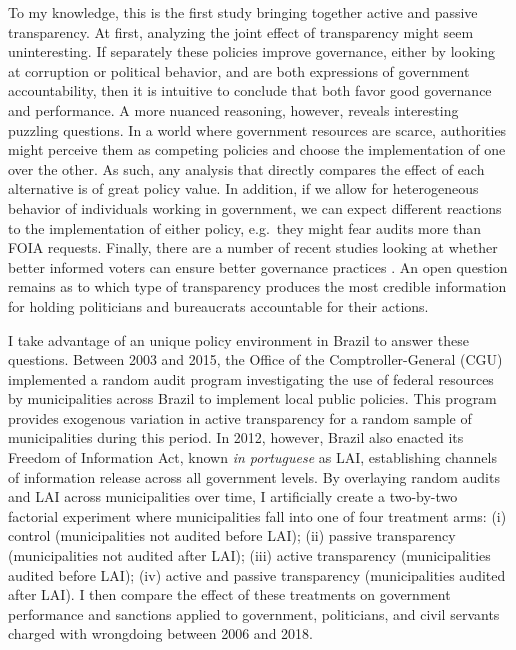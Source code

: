\documentclass[11pt]{article}
\begin{document}
To my knowledge, this is the first study bringing together active and passive transparency. At first, analyzing the joint effect of transparency might seem uninteresting. If separately these policies improve governance, either by looking at corruption or political behavior, and are both expressions of government accountability, then it is intuitive to conclude that both favor good governance and performance. A more nuanced reasoning, however, reveals interesting puzzling questions. In a world where government resources are scarce, authorities might perceive them as competing policies and choose the implementation of one over the other. As such, any analysis that directly compares the effect of each alternative is of great policy value. In addition, if we allow for heterogeneous behavior of individuals working in government, we can expect different reactions to the implementation of either policy, e.g.~they might fear audits more than FOIA requests. Finally, there are a number of recent studies looking at whether better informed voters can ensure better governance practices \citep{PandeCaninformedvoters2011,WintersLackingInformationCondoning2013,ChongDoesCorruptionInformation2015,Weitz-ShapiroCanCitizensDiscern2017}. An open question remains as to which type of transparency produces the most credible information for holding politicians and bureaucrats accountable for their actions.

I take advantage of an unique policy environment in Brazil to answer these questions. Between 2003 and 2015, the Office of the Comptroller-General (CGU) implemented a random audit program investigating the use of federal resources by municipalities across Brazil to implement local public policies. This program provides exogenous variation in active transparency for a random sample of municipalities during this period. In 2012, however, Brazil also enacted its Freedom of Information Act, known  \emph{in portuguese} as LAI, establishing channels of information release across all government levels. By overlaying random audits and LAI across municipalities over time, I artificially create a two-by-two factorial experiment where municipalities fall into one of four treatment arms: (i) control (municipalities not audited before LAI); (ii) passive transparency (municipalities not audited after LAI); (iii) active transparency (municipalities audited before LAI); (iv) active and passive transparency (municipalities audited after LAI). I then compare the effect of these treatments on government performance and sanctions applied to government, politicians, and civil servants charged with wrongdoing between 2006 and 2018.
\end{document}
